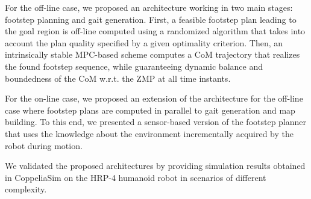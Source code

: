 For the off-line case, we proposed an architecture working in two main stages: footstep planning and gait generation.
First, a feasible footstep plan leading to the goal region is off-line computed using a randomized algorithm that takes into account the plan quality specified by a given optimality criterion.
Then, an intrinsically stable MPC-based scheme computes a CoM trajectory that realizes the found footstep sequence, while guaranteeing dynamic balance and boundedness of the CoM w.r.t. the ZMP at all time instants.

For the on-line case, we proposed an extension of the architecture for the off-line case where footstep plans are computed in parallel to gait generation and map building.
To this end, we presented a sensor-based version of the footstep planner that uses the knowledge about the environment incrementally acquired by the robot during motion.

We validated  the proposed architectures by providing simulation results obtained in CoppeliaSim on the HRP-4 humanoid robot in scenarios of different complexity.


